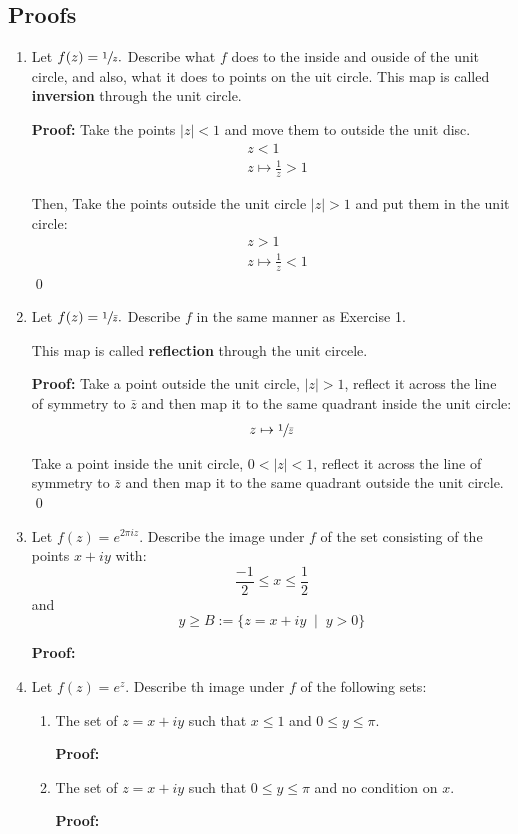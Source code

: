 \subsection{Proofs}
\begin{enumerate}
	\item Let $f(z) = \sfrac{1}{z}.$ Describe what $f$ does to the inside and ouside of the unit circle, and also, what it does to points on the uit circle. This map is called \textbf{inversion} through the unit circle.
	
	\textbf{Proof:}
	Take the points $|z| < 1$ and move them to outside the unit disc.
	\begin{align*}
		&z < 1 \\
		&z \mapsto \frac{1}{z} > 1
	\end{align*}

	Then, Take the points outside the unit circle $|z| > 1$ and put them in the unit circle:
	\begin{align*}
		&z > 1 \\
		&z \mapsto \frac{1}{z} < 1
	\end{align*}
	\qed


	\item Let $f(z) = \sfrac{1}{\bar{z}}.$ Describe $f$ in the same manner as Exercise 1. 

	This map is called \textbf{reflection} through the unit circele.
	
	\textbf{Proof:}
	Take a point outside the unit circle, $|z| > 1$, reflect it across the line of symmetry to $\bar{z}$ and then map it to the same quadrant inside the unit circle:
	\begin{align*}
		z \mapsto \sfrac{1}{\bar{z}} \\
	\end{align*}

	Take a point inside the unit circle, $0 < |z| < 1$, reflect it across the line of symmetry to $\bar{z}$ and then map it to the same quadrant outside the unit circle. 
	\qed


	\item Let $f(z) = e^{2\pi iz}.$ Describe the image under $f$ of the set consisting of the points $x + iy$ with:
	\[ \frac{-1}{2} \leq x \leq \frac{1}{2} \]
	and
	\[ y \geq B := \{ z = x + iy \;\;|\;\; y > 0 \} \]

	\textbf{Proof:}

	\item Let $f(z) = e^z.$ Describe th image under $f$ of the following sets:
	
	\begin{enumerate}
		\item The set of $z = x + iy$ such that $x \leq 1$ and $0 \leq y \leq \pi.$
		
		\textbf{Proof:}

		\item The set of $z = x + iy$ such that $0 \leq y \leq \pi$ and no condition on $x.$
		
		\textbf{Proof:}

	\end{enumerate}
	
\end{enumerate}

